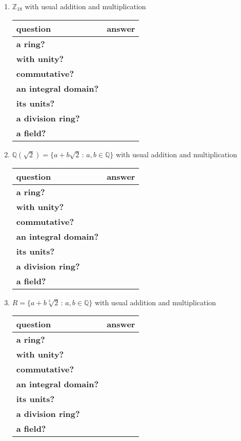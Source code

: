 \documentclass[12pt]{article}
\begin{document}
\begin{enumerate}
\begin{enumerate}
	
	\vfill
	
	\item $\mathbb{Z}_{18}$ with usual addition and multiplication\\
	
	\begin{tabular}{lr}
	question&answer\\
	\hline
	\textbf{a ring?}&\\
	\textbf{with unity?}&\\
	\textbf{commutative?}&\\
	\textbf{an integral domain?}&\\
	\textbf{its units?}&\\
	\textbf{a division ring?}&\\
	\textbf{a field?}&\\
	\end{tabular}

	
	\vfill

	\item $\mathbb{Q}(\sqrt{2})=\{ a+b\sqrt{2} \, :\, a,b \in \mathbb{Q}\}$ with usual addition and multiplication\\
	
	\begin{tabular}{lr}
	question&answer\\
	\hline
	\textbf{a ring?}&\\
	\textbf{with unity?}&\\
	\textbf{commutative?}&\\
	\textbf{an integral domain?}&\\
	\textbf{its units?}&\\
	\textbf{a division ring?}&\\
	\textbf{a field?}&\\
	\end{tabular}
	
	\vfill
	\item $R=\{ a+b\sqrt[3]{2} \, :\, a,b \in \mathbb{Q}\}$ with usual addition and multiplication\\
	
	\begin{tabular}{lr}
	question&answer\\
	\hline
	\textbf{a ring?}&\\
	\textbf{with unity?}&\\
	\textbf{commutative?}&\\
	\textbf{an integral domain?}&\\
	\textbf{its units?}&\\
	\textbf{a division ring?}&\\
	\textbf{a field?}&\\
	\end{tabular}


\end{enumerate}
\end{enumerate}
\end{document}
